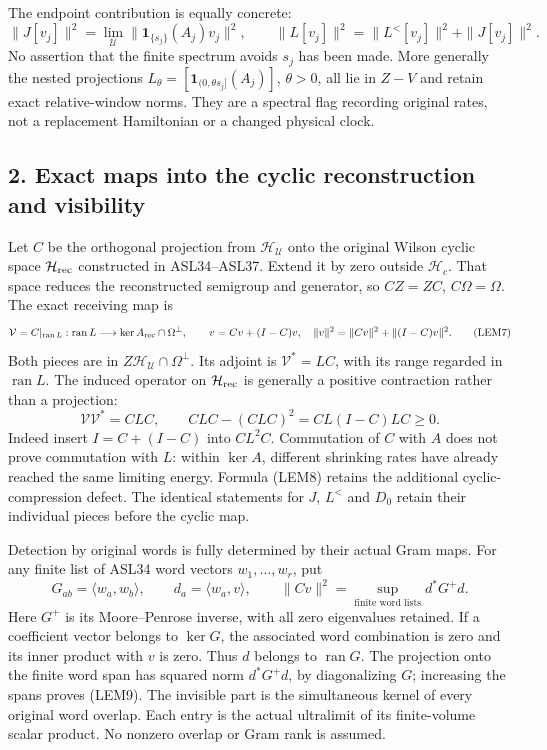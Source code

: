\documentclass[11pt]{article}
\begin{document}
The endpoint contribution is equally concrete:
\[
 \|J[v_j]\|^2=\lim_{\mathcal U}\|\mathbf1_{\{s_j\}}(A_j)v_j\|^2,
 \qquad \|L[v_j]\|^2=\|L^{<}[v_j]\|^2+\|J[v_j]\|^2.
 \tag{LEM6}
\]
No assertion that the finite spectrum avoids \(s_j\) has been made. More generally the nested projections \(L_\theta=[\mathbf1_{(0,\theta s_j]}(A_j)]\), \(\theta>0\), all lie in \(Z-V\) and retain exact relative-window norms. They are a spectral flag recording original rates, not a replacement Hamiltonian or a changed physical clock.

\subsection*{2. Exact maps into the cyclic reconstruction and visibility}

Let \(C\) be the orthogonal projection from \(\mathcal H_{\mathcal U}\) onto the original Wilson cyclic space \(\mathcal H_{\rm rec}\) constructed in ASL34–ASL37. Extend it by zero outside \(\mathcal H_c\). That space reduces the reconstructed semigroup and generator, so \(CZ=ZC\), \(C\Omega=\Omega\). The exact receiving map is
\[
 \mathcal V=C|_{\operatorname{ran}L}:
 \operatorname{ran}L\longrightarrow\ker A_{\rm rec}\cap\Omega^\perp,
 \qquad
 v=Cv+(I-C)v,\quad
 \|v\|^2=\|Cv\|^2+\|(I-C)v\|^2.
 \tag{LEM7}
\]
Both pieces are in \(Z\mathcal H_{\mathcal U}\cap\Omega^\perp\). Its adjoint is \(\mathcal V^*=LC\), with its range regarded in \(\operatorname{ran}L\). The induced operator on \(\mathcal H_{\rm rec}\) is generally a positive contraction rather than a projection:
\[
 \mathcal V\mathcal V^*=CLC,
 \qquad CLC-(CLC)^2=CL(I-C)LC\ge0.
 \tag{LEM8}
\]
Indeed insert \(I=C+(I-C)\) into \(CL^2C\). Commutation of \(C\) with \(A\) does not prove commutation with \(L\): within \(\ker A\), different shrinking rates have already reached the same limiting energy. Formula (LEM8) retains the additional cyclic-compression defect. The identical statements for \(J\), \(L^{<}\) and \(D_0\) retain their individual pieces before the cyclic map.

Detection by original words is fully determined by their actual Gram maps. For any finite list of ASL34 word vectors \(w_1,\ldots,w_r\), put
\[
 G_{ab}=\langle w_a,w_b\rangle,\qquad d_a=\langle w_a,v\rangle,
 \qquad
 \|Cv\|^2=\sup_{\text{finite word lists}}d^*G^+d.
 \tag{LEM9}
\]
Here \(G^+\) is its Moore–Penrose inverse, with all zero eigenvalues retained. If a coefficient vector belongs to \(\ker G\), the associated word combination is zero and its inner product with \(v\) is zero. Thus \(d\) belongs to \(\operatorname{ran}G\). The projection onto the finite word span has squared norm \(d^*G^+d\), by diagonalizing \(G\); increasing the spans proves (LEM9). The invisible part is the simultaneous kernel of every original word overlap. Each entry is the actual ultralimit of its finite-volume scalar product. No nonzero overlap or Gram rank is assumed.
\end{document}
